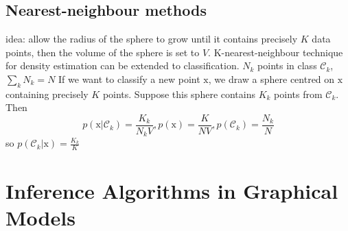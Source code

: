 \documentclass[a4paper]{book}
\begin{document}
\subsection{Nearest-neighbour methods}
idea: allow the radius of the sphere to grow until it contains precisely $K$ data points, then the volume of the sphere is set to $V$.\newline
K-nearest-neighbour technique for density estimation can be extended to classification.
$N_k$ points in class $\mathcal C_k$, $\sum_kN_k=N$
\newline
If we want to classify a new point $\mathrm x$, we draw a sphere centred on $\mathrm x$ containing precisely $K$ points. Suppose this sphere contains $K_k$ points from $\mathcal C_k$. Then
$$p(\mathrm x|\mathcal C_k) = \frac{K_k}{N_kV} , p(\mathrm x) = \frac{K}{NV}, p(\mathcal C_k) = \frac{N_k}{N}$$
so $p(\mathcal C_k|\mathrm x) = \frac{K_k}{K}$
\section{Inference Algorithms in Graphical Models}
\end{document}
